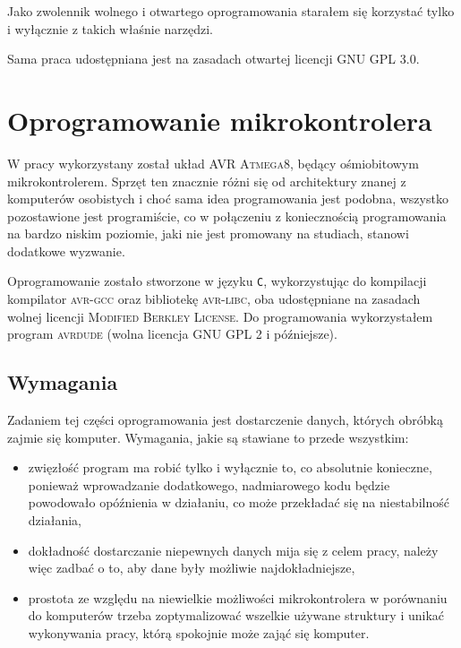 \label{ch:implementation}

Jako zwolennik wolnego i otwartego oprogramowania starałem się korzystać tylko i wyłącznie z takich właśnie narzędzi.

Sama praca udostępniana jest na zasadach otwartej licencji \textsc{GNU GPL 3.0}.

\section{Oprogramowanie mikrokontrolera}
W pracy wykorzystany został układ \textsc{AVR Atmega8}, będący ośmiobitowym mikrokontrolerem. Sprzęt ten znacznie różni się od architektury znanej z komputerów osobistych  i choć sama idea programowania jest podobna, wszystko pozostawione jest programiście, co w połączeniu z koniecznością programowania na bardzo niskim poziomie, jaki nie jest promowany na studiach, stanowi dodatkowe wyzwanie.

Oprogramowanie zostało stworzone w języku \texttt{C}, wykorzystując do kompilacji kompilator \textsc{avr-gcc} oraz bibliotekę \textsc{avr-libc}, oba udostępniane na zasadach wolnej licencji \textsc{Modified Berkley License}. Do programowania wykorzystałem program \textsc{avrdude} (wolna licencja \textsc{GNU GPL 2} i późniejsze).

\subsection{Wymagania}
Zadaniem tej części oprogramowania jest dostarczenie danych, których obróbką zajmie się komputer. Wymagania, jakie są stawiane to przede wszystkim:
\begin{itemize}
 \item zwięzłość \ppauza program ma robić tylko i wyłącznie to, co absolutnie konieczne, ponieważ wprowadzanie dodatkowego, nadmiarowego kodu będzie powodowało opóźnienia w działaniu, co może przekładać się na
    niestabilność działania,
 \item dokładność \ppauza dostarczanie niepewnych danych mija się z celem pracy, należy więc zadbać o to, aby dane były możliwie najdokładniejsze,
 \item prostota \ppauza ze względu na niewielkie możliwości mikrokontrolera \ppauza w porównaniu do komputerów \ppauza trzeba zoptymalizować wszelkie używane struktury i unikać wykonywania pracy, którą spokojnie może zająć się komputer.
\end{itemize}


